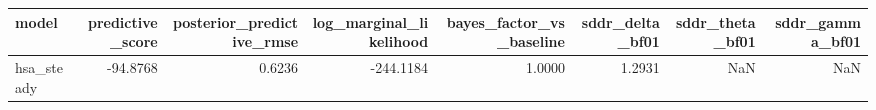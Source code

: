 \begin{tabular}{lrrrrrrr}
\toprule
model & predictive\_score & posterior\_predictive\_rmse & log\_marginal\_likelihood & bayes\_factor\_vs\_baseline & sddr\_delta\_bf01 & sddr\_theta\_bf01 & sddr\_gamma\_bf01 \\
\midrule
hsa\_steady & -94.8768 & 0.6236 & -244.1184 & 1.0000 & 1.2931 & NaN & NaN \\
\bottomrule
\end{tabular}

